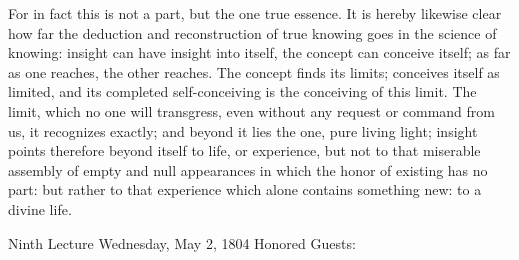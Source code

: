 For in fact this is not a part, but the one true essence.
It is hereby likewise clear how far
the deduction and reconstruction of
true knowing goes in the science of knowing:
insight can have insight into itself,
the concept can conceive itself;
as far as one reaches, the other reaches.
The concept finds its limits;
conceives itself as limited,
and its completed self-conceiving is
the conceiving of this limit.
The limit, which no one will transgress,
even without any request or command from us,
it recognizes exactly;
and beyond it lies the one, pure living light;
insight points therefore beyond itself
to life, or experience,
but not to that miserable assembly of empty and null
appearances in which the honor of existing has no part:
but rather to that experience which alone contains something new:
to a divine life.

Ninth Lecture
Wednesday, May 2, 1804
Honored Guests:

